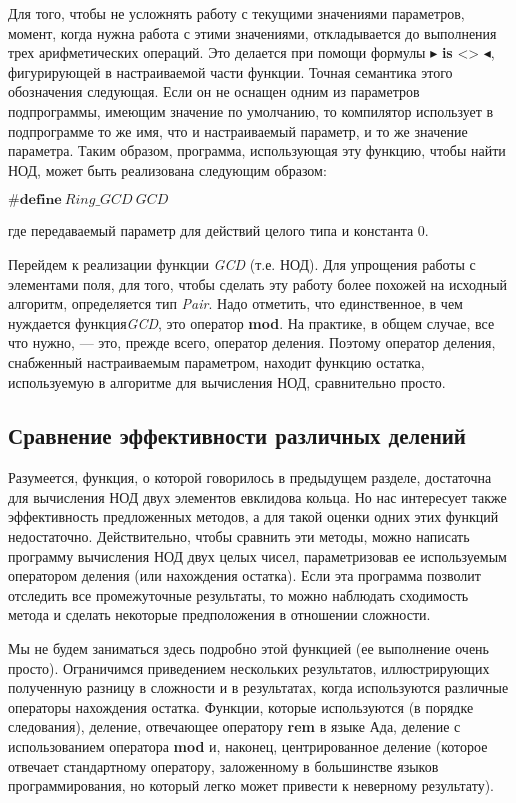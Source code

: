 \documentclass{mai_book}
\begin{document}
Для того, чтобы не усложнять работу с текущими значениями параметров, момент, когда нужна работа с этими значениями, откладывается до выполнения трех арифметических операций. Это делается при помощи формулы $\blacktriangleright$ \textbf{is} <> $\blacktriangleleft$, фигурирующей в настраиваемой части функции. Точная семантика этого обозначения следующая. Если он не оснащен одним из параметров подпрограммы, имеющим значение по умолчанию, то компилятор использует в подпрограмме то же имя, что и настраиваемый параметр, и то же значение параметра. Таким образом, программа, использующая эту функцию, чтобы найти НОД, может быть реализована следующим образом:\newline 

$\# \textbf{define}\: Ring\_ GCD\: GCD$\newline

\noindent где передаваемый параметр для действий целого типа и константа 0.\newline
 
Перейдем к реализации функции \textit{GCD} (т.е. НОД). Для упрощения 
работы с элементами поля, для того, чтобы сделать эту работу более 
похожей на исходный алгоритм, определяется тип \textit{Pair}. Надо отметить, 
что единственное, в чем нуждается функция\textit{GCD}, это оператор \textbf{mod}. 
На практике, в общем случае, все что нужно, — это, прежде всего,  
оператор деления. Поэтому оператор деления, снабженный настраиваемым 
параметром, находит функцию остатка, используемую в алгоритме для 
вычисления НОД, сравнительно просто. 

\subsection{Сравнение эффективности различных делений}
Разумеется, функция, о которой говорилось в предыдущем разделе, достаточна для вычисления НОД двух элементов евклидова кольца. Но нас интересует также эффективность предложенных методов, а для такой оценки одних этих функций недостаточно. Действительно, чтобы сравнить эти методы, можно написать программу вычисления НОД двух целых чисел, параметризовав ее используемым оператором деления (или нахождения остатка). Если эта программа позволит отследить все промежуточные результаты, то можно наблюдать сходимость метода и сделать некоторые предположения в отношении сложности.

 Мы не будем заниматься здесь подробно этой функцией (ее выполнение очень просто). Ограничимся приведением нескольких результатов, иллюстрирующих полученную разницу в сложности и в результатах, когда используются различные операторы нахождения остатка. Функции, которые используются (в порядке следования), деление, отвечающее оператору \textbf{rem} в языке Ада, деление с использованием оператора \textbf{mod} и, наконец, центрированное деление (которое отвечает стандартному оператору, заложенному в большинстве языков программирования, но который
легко может привести к неверному результату).
\pagebreak
\end{document}

